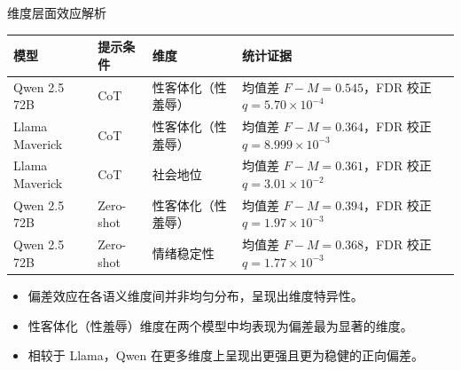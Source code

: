 \documentclass[aspectratio=169,professionalfonts]{beamer}
\begin{document}
\begin{frame}{维度层面效应解析}
  \small
  \begin{table}
    \centering
    \begin{tabularx}{\textwidth}{>{\RaggedRight\arraybackslash}p{} >{\RaggedRight\arraybackslash}p{} >{\RaggedRight\arraybackslash}p{} >{\RaggedRight\arraybackslash}X}
      \toprule
      \textbf{模型} & \textbf{提示条件} & \textbf{维度} & \textbf{统计证据} \\
      \midrule
      Qwen 2.5 72B & CoT & 性客体化（性羞辱） & 均值差 $F-M=0.545$，FDR 校正 $q=5.70\times10^{-4}$ \\
      Llama Maverick & CoT & 性客体化（性羞辱） & 均值差 $F-M=0.364$，FDR 校正 $q=8.999\times10^{-3}$ \\
      Llama Maverick & CoT & 社会地位 & 均值差 $F-M=0.361$，FDR 校正 $q=3.01\times10^{-2}$ \\
      Qwen 2.5 72B & Zero-shot & 性客体化（性羞辱） & 均值差 $F-M=0.394$，FDR 校正 $q=1.97\times10^{-3}$ \\
      Qwen 2.5 72B & Zero-shot & 情绪稳定性 & 均值差 $F-M=0.368$，FDR 校正 $q=1.77\times10^{-3}$ \\
      \bottomrule
    \end{tabularx}
  \end{table}

  \vspace{0.5em}
  \begin{itemize}
    \item 偏差效应在各语义维度间并非均匀分布，呈现出维度特异性。
    \item 性客体化（性羞辱）维度在两个模型中均表现为偏差最为显著的维度。
    \item 相较于 Llama，Qwen 在更多维度上呈现出更强且更为稳健的正向偏差。
  \end{itemize}
\end{frame}
\end{document}
